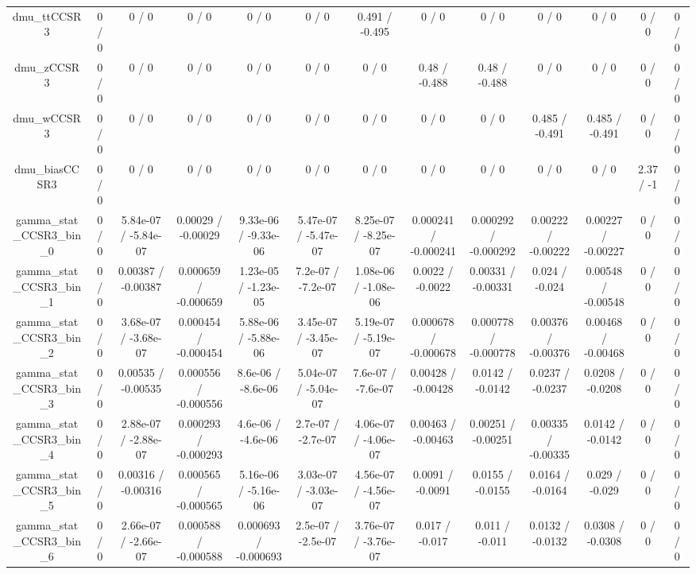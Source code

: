 \documentclass[10pt]{article}
\begin{document}
\begin{table}[htbp]
\begin{center}
\begin{tabular}{|c|c|c|c|c|c|c|c|c|c|c|c|c|}
  dmu_ttCCSR3 & 0 / 0 & 0 / 0 & 0 / 0 & 0 / 0 & 0 / 0 & 0.491 / -0.495 & 0 / 0 & 0 / 0 & 0 / 0 & 0 / 0 & 0 / 0 & 0 / 0 \\ 
  dmu_zCCSR3 & 0 / 0 & 0 / 0 & 0 / 0 & 0 / 0 & 0 / 0 & 0 / 0 & 0.48 / -0.488 & 0.48 / -0.488 & 0 / 0 & 0 / 0 & 0 / 0 & 0 / 0 \\ 
  dmu_wCCSR3 & 0 / 0 & 0 / 0 & 0 / 0 & 0 / 0 & 0 / 0 & 0 / 0 & 0 / 0 & 0 / 0 & 0.485 / -0.491 & 0.485 / -0.491 & 0 / 0 & 0 / 0 \\ 
  dmu_biasCCSR3 & 0 / 0 & 0 / 0 & 0 / 0 & 0 / 0 & 0 / 0 & 0 / 0 & 0 / 0 & 0 / 0 & 0 / 0 & 0 / 0 & 2.37 / -1 & 0 / 0 \\ 
  gamma_stat_CCSR3_bin_0 & 0 / 0 & 5.84e-07 / -5.84e-07 & 0.00029 / -0.00029 & 9.33e-06 / -9.33e-06 & 5.47e-07 / -5.47e-07 & 8.25e-07 / -8.25e-07 & 0.000241 / -0.000241 & 0.000292 / -0.000292 & 0.00222 / -0.00222 & 0.00227 / -0.00227 & 0 / 0 & 0 / 0 \\ 
  gamma_stat_CCSR3_bin_1 & 0 / 0 & 0.00387 / -0.00387 & 0.000659 / -0.000659 & 1.23e-05 / -1.23e-05 & 7.2e-07 / -7.2e-07 & 1.08e-06 / -1.08e-06 & 0.0022 / -0.0022 & 0.00331 / -0.00331 & 0.024 / -0.024 & 0.00548 / -0.00548 & 0 / 0 & 0 / 0 \\ 
  gamma_stat_CCSR3_bin_2 & 0 / 0 & 3.68e-07 / -3.68e-07 & 0.000454 / -0.000454 & 5.88e-06 / -5.88e-06 & 3.45e-07 / -3.45e-07 & 5.19e-07 / -5.19e-07 & 0.000678 / -0.000678 & 0.000778 / -0.000778 & 0.00376 / -0.00376 & 0.00468 / -0.00468 & 0 / 0 & 0 / 0 \\ 
  gamma_stat_CCSR3_bin_3 & 0 / 0 & 0.00535 / -0.00535 & 0.000556 / -0.000556 & 8.6e-06 / -8.6e-06 & 5.04e-07 / -5.04e-07 & 7.6e-07 / -7.6e-07 & 0.00428 / -0.00428 & 0.0142 / -0.0142 & 0.0237 / -0.0237 & 0.0208 / -0.0208 & 0 / 0 & 0 / 0 \\ 
  gamma_stat_CCSR3_bin_4 & 0 / 0 & 2.88e-07 / -2.88e-07 & 0.000293 / -0.000293 & 4.6e-06 / -4.6e-06 & 2.7e-07 / -2.7e-07 & 4.06e-07 / -4.06e-07 & 0.00463 / -0.00463 & 0.00251 / -0.00251 & 0.00335 / -0.00335 & 0.0142 / -0.0142 & 0 / 0 & 0 / 0 \\ 
  gamma_stat_CCSR3_bin_5 & 0 / 0 & 0.00316 / -0.00316 & 0.000565 / -0.000565 & 5.16e-06 / -5.16e-06 & 3.03e-07 / -3.03e-07 & 4.56e-07 / -4.56e-07 & 0.0091 / -0.0091 & 0.0155 / -0.0155 & 0.0164 / -0.0164 & 0.029 / -0.029 & 0 / 0 & 0 / 0 \\ 
  gamma_stat_CCSR3_bin_6 & 0 / 0 & 2.66e-07 / -2.66e-07 & 0.000588 / -0.000588 & 0.000693 / -0.000693 & 2.5e-07 / -2.5e-07 & 3.76e-07 / -3.76e-07 & 0.017 / -0.017 & 0.011 / -0.011 & 0.0132 / -0.0132 & 0.0308 / -0.0308 & 0 / 0 & 0 / 0 \\ 

\end{tabular}
\end{center}
\end{table}
\end{document}
